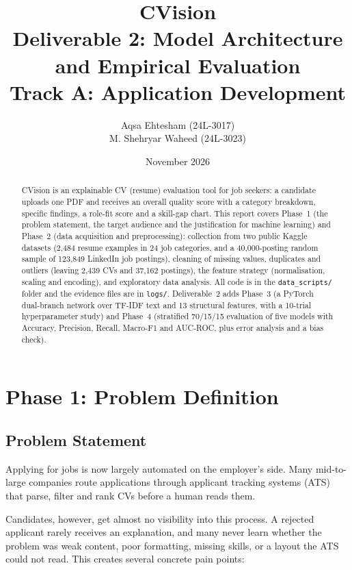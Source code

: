 \documentclass[11pt,a4paper]{article}
\title{\textbf{CVision}\\[2pt]
  \large Deliverable 2: Model Architecture and Empirical Evaluation\\[2pt]
  \normalsize Track A: Application Development}
\author{Aqsa Ehtesham (24L-3017)\\ M. Shehryar Waheed (24L-3023)}
\date{November 2026}
\begin{document}
\maketitle

\begin{abstract}
\noindent CVision is an explainable CV (resume) evaluation tool for job
seekers: a candidate uploads one PDF and receives an overall quality
score with a category breakdown, specific findings, a role-fit score and
a skill-gap chart. This report covers Phase~1 (the problem statement,
the target audience and the justification for machine learning) and
Phase~2 (data acquisition and preprocessing): collection from two public
Kaggle datasets (2{,}484 resume examples in 24 job categories, and a
40{,}000-posting random sample of 123{,}849 LinkedIn job postings),
cleaning of missing values, duplicates and outliers (leaving 2{,}439 CVs
and 37{,}162 postings), the feature strategy (normalisation, scaling and
encoding), and exploratory data analysis. All code is in the
\texttt{data\_scripts/} folder and the evidence files are in
\texttt{logs/}.
Deliverable~2 adds Phase~3 (a PyTorch dual-branch network over TF-IDF text and
13 structural features, with a 10-trial hyperparameter study) and Phase~4
(stratified 70/15/15 evaluation of five models with Accuracy, Precision, Recall,
Macro-F1 and AUC-ROC, plus error analysis and a bias check).
\end{abstract}


\tableofcontents
\newpage


\section{Phase 1: Problem Definition}

\subsection{Problem Statement}

Applying for jobs is now largely automated on the employer's side. Many
mid-to-large companies route applications through applicant tracking
systems (ATS) that parse, filter and rank CVs before a human reads them.

Candidates, however, get almost no visibility into this process. A
rejected applicant rarely receives an explanation, and many never learn
whether the problem was weak content, poor formatting, missing skills,
or a layout the ATS could not read. This creates several concrete pain
points:
\end{document}
